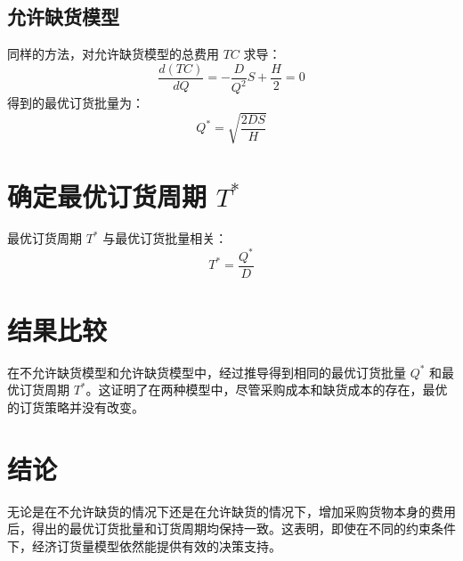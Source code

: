 \documentclass{article}
\begin{document}
\subsection{允许缺货模型}

同样的方法，对允许缺货模型的总费用 \( TC \) 求导：
\[
\frac{d(TC)}{dQ} = -\frac{D}{Q^2} S + \frac{H}{2} = 0
\]
得到的最优订货批量为：
\[
Q^* = \sqrt{\frac{2DS}{H}}
\]

\section{确定最优订货周期 \( T^* \)}

最优订货周期 \( T^* \) 与最优订货批量相关：
\[
T^* = \frac{Q^*}{D}
\]

\section{结果比较}

在不允许缺货模型和允许缺货模型中，经过推导得到相同的最优订货批量 \( Q^* \) 和最优订货周期 \( T^* \)。这证明了在两种模型中，尽管采购成本和缺货成本的存在，最优的订货策略并没有改变。

\section{结论}

无论是在不允许缺货的情况下还是在允许缺货的情况下，增加采购货物本身的费用后，得出的最优订货批量和订货周期均保持一致。这表明，即使在不同的约束条件下，经济订货量模型依然能提供有效的决策支持。
\end{document}
